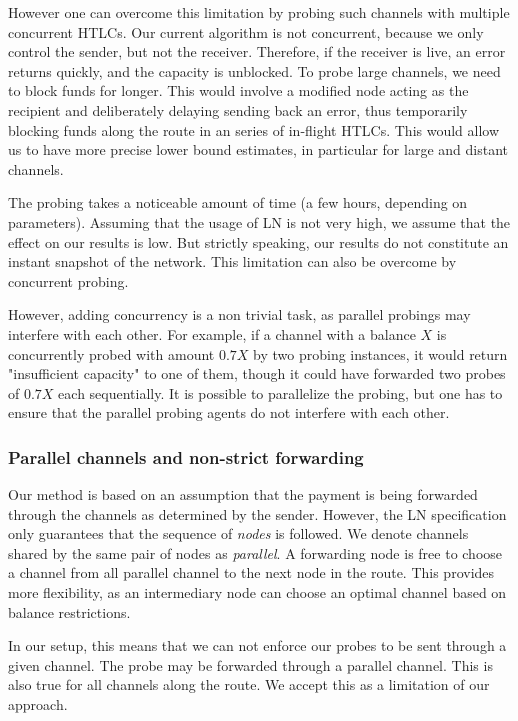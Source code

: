 However one can overcome this limitation by probing such channels with multiple concurrent HTLCs.
Our current algorithm is not concurrent, because we only control the sender, but not the receiver.
Therefore, if the receiver is live, an error returns quickly, and the capacity is unblocked.
To probe large channels, we need to block funds for longer.
This would involve a modified node acting as the recipient and deliberately delaying sending back an error, thus temporarily blocking funds along the route in an series of in-flight HTLCs.
This would allow us to have more precise lower bound estimates, in particular for large and distant channels.

The probing takes a noticeable amount of time (a few hours, depending on parameters).
Assuming that the usage of LN is not very high, we assume that the effect on our results is low.
But strictly speaking, our results do not constitute an instant snapshot of the network.
This limitation can also be overcome by concurrent probing.

However, adding concurrency is a non trivial task, as parallel probings may interfere with each other.
For example, if a channel with a balance $X$ is concurrently probed with amount $0.7X$ by two probing instances, it would return "insufficient capacity" to one of them, though it could have forwarded two probes of $0.7X$ each sequentially.
It is possible to parallelize the probing, but one has to ensure that the parallel probing agents do not interfere with each other.


\subsubsection{Parallel channels and non-strict forwarding}

Our method is based on an assumption that the payment is being forwarded through the channels as determined by the sender.
However, the LN specification only guarantees that the sequence of \textit{nodes} is followed.
We denote channels shared by the same pair of nodes as \textit{parallel}.
A forwarding node is free to choose a channel from all parallel channel to the next node in the route.
This provides more flexibility, as an intermediary node can choose an optimal channel based on balance restrictions.

In our setup, this means that we can not enforce our probes to be sent through a given channel.
The probe may be forwarded through a parallel channel.
This is also true for all channels along the route.
We accept this as a limitation of our approach.

